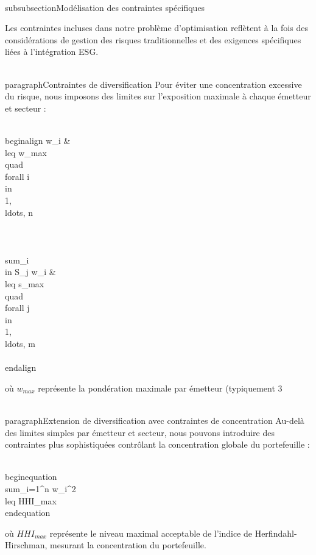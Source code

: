 \\subsubsection{Modélisation des contraintes spécifiques}

Les contraintes incluses dans notre problème d'optimisation reflètent à la fois des considérations de gestion des risques traditionnelles et des exigences spécifiques liées à l'intégration ESG.

\\paragraph{Contraintes de diversification} 
Pour éviter une concentration excessive du risque, nous imposons des limites sur l'exposition maximale à chaque émetteur et secteur :

\\begin{align}
w_i &\\leq w_{max} \\quad \\forall i \\in \\{1, \\ldots, n\\} \\\\
\\sum_{i \\in S_j} w_i &\\leq s_{max} \\quad \\forall j \\in \\{1, \\ldots, m\\}
\\end{align}

où $w_{max}$ représente la pondération maximale par émetteur (typiquement 3%

\\paragraph{Extension de diversification avec contraintes de concentration}
Au-delà des limites simples par émetteur et secteur, nous pouvons introduire des contraintes plus sophistiquées contrôlant la concentration globale du portefeuille :

\\begin{equation}
\\sum_{i=1}^{n} w_i^2 \\leq HHI_{max}
\\end{equation}

où $HHI_{max}$ représente le niveau maximal acceptable de l'indice de Herfindahl-Hirschman, mesurant la concentration du portefeuille.

